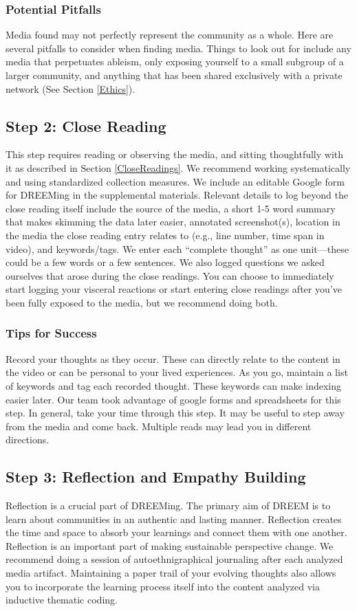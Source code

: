 \subsubsection{Potential Pitfalls}
Media found may not perfectly represent the community as a whole. Here are several pitfalls to consider when finding media. Things to look out for include any media that perpetuates ableism, only exposing yourself to a small subgroup of a larger community, and anything that has been shared exclusively with a private network (See Section \ref{Ethics}).

\subsection{Step 2: Close Reading}
This step requires reading or observing the media, and sitting thoughtfully with it as described in Section \ref{CloseReadings}. We recommend working systematically and using standardized collection measures. We include an editable Google form for DREEMing in the supplemental materials. Relevant details to log beyond the close reading itself include the source of the media, a short 1-5 word summary that makes skimming the data later easier, annotated screenshot(s), location in the media the close reading entry relates to (e.g., line number, time span in video), and keywords/tags. We enter each ``complete thought'' as one unit—these could be a few words or a few sentences. We also logged questions we asked ourselves that arose during the close readings. You can choose to immediately start logging your visceral reactions or start entering close readings after you've been fully exposed to the media, but we recommend doing both.

\subsubsection{Tips for Success}
Record your thoughts as they occur. These can directly relate to the content in the video or can be personal to your lived experiences. As you go, maintain a list of keywords and tag each recorded thought. These keywords can make indexing easier later. Our team took advantage of google forms and spreadsheets for this step. In general, take your time through this step. It may be useful to step away from the media and come back. Multiple reads may lead you in different directions. 

\subsection{Step 3: Reflection and Empathy Building}
Reflection is a crucial part of DREEMing. The primary aim of DREEM is to learn about communities in an authentic and lasting manner. Reflection creates the time and space to absorb your learnings and connect them with one another. Reflection is an important part of making sustainable perspective change. \cite{lyubomirskyPursuingHappinessArchitecture2005} We recommend doing a session of autoethnigraphical journaling after each analyzed media artifact. 
Maintaining a paper trail of your evolving thoughts also allows you to incorporate the learning process itself into the content analyzed via inductive thematic coding. 

